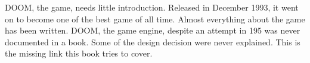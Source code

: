 DOOM, the game, needs little introduction. Released in December 1993, it went on to become one of the best game of all time. Almost everything about the game has been written. DOOM, the game engine, despite an attempt in 195 was never documented in a book. Some of the design decision were never explained. This is the missing link this book tries to cover.\\
\par\